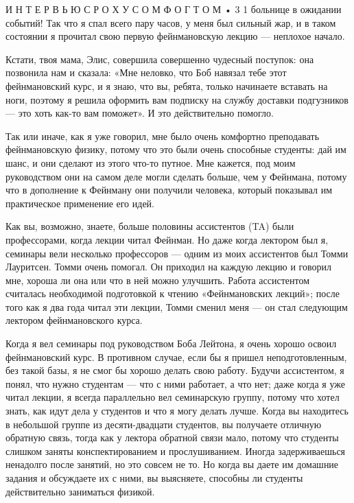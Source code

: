 \documentclass[10pt,oneside]{article}
\begin{document}
И Н Т Е Р В Ь Ю  С  Р О Х У С О М  Ф О Г Т О М • 3 1 больнице в ожидании событий! Так что я спал всего пару часов, у меня был сильный жар, и в таком состоянии я прочитал свою первую фейнмановскую лекцию --- неплохое начало.\par

Кстати, твоя мама, Элис, совершила совершенно чудесный поступок: она позвонила нам и сказала: «Мне неловко, что Боб навязал тебе этот фейнмановский курс, и я знаю, что вы, ребята, только начинаете вставать на ноги, поэтому я решила оформить вам подписку на службу доставки подгузников --- это хоть как-то вам поможет». И это действительно помогло.\par

Так или иначе, как я уже говорил, мне было очень комфортно преподавать фейнмановскую физику, потому что это были очень способные студенты: дай им шанс, и они сделают из этого что-то путное. Мне кажется, под моим руководством они на самом деле могли сделать больше, чем у Фейнмана, потому что в дополнение к Фейнману они получили человека, который показывал им практическое применение его идей.\par

Как вы, возможно, знаете, больше половины ассистентов (TA) были профессорами, когда лекции читал Фейнман. Но даже когда лектором был я, семинары вели несколько профессоров --- одним из моих ассистентов был Томми Лауритсен. Томми очень помогал. Он приходил на каждую лекцию и говорил мне, хороша ли она или что в ней можно улучшить. Работа ассистентом считалась необходимой подготовкой к чтению «Фейнмановских лекций»; после того как я два года читал эти лекции, Томми сменил меня --- он стал следующим лектором фейнмановского курса.\par

Когда я вел семинары под руководством Боба Лейтона, я очень хорошо освоил фейнмановский курс. В противном случае, если бы я пришел неподготовленным, без такой базы, я не смог бы хорошо делать свою работу. Будучи ассистентом, я понял, что нужно студентам --- что с ними работает, а что нет; даже когда я уже читал лекции, я всегда параллельно вел семинарскую группу, потому что хотел знать, как идут дела у студентов и что я могу делать лучше. Когда вы находитесь в небольшой группе из десяти-двадцати студентов, вы получаете отличную обратную связь, тогда как у лектора обратной связи мало, потому что студенты слишком заняты конспектированием и прослушиванием. Иногда задерживаешься ненадолго после занятий, но это совсем не то. Но когда вы даете им домашние задания и обсуждаете их с ними, вы выясняете, способны ли студенты действительно заниматься физикой.\par
\end{document}
